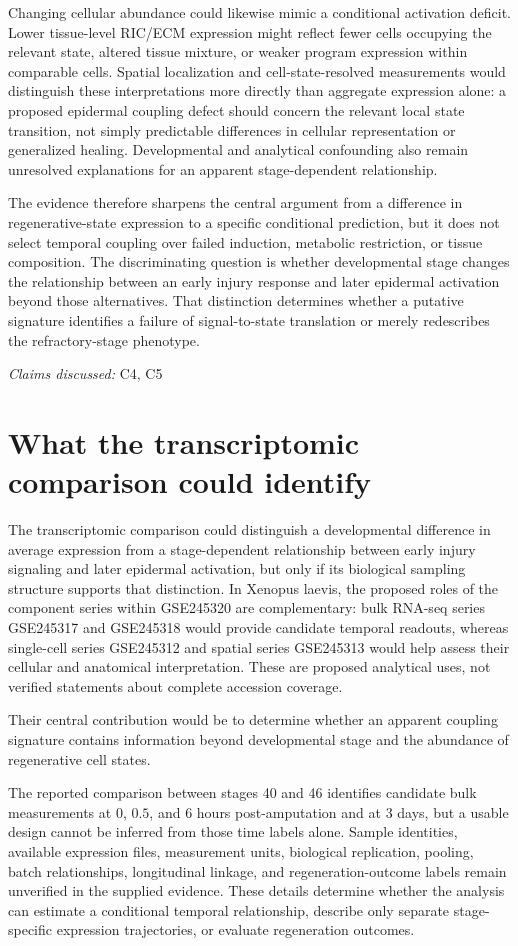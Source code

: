 \documentclass[11pt]{article}
\begin{document}
Changing cellular abundance could likewise mimic a conditional activation deficit. Lower tissue-level RIC/ECM expression might reflect fewer cells occupying the relevant state, altered tissue mixture, or weaker program expression within comparable cells. Spatial localization and cell-state-resolved measurements would distinguish these interpretations more directly than aggregate expression alone: a proposed epidermal coupling defect should concern the relevant local state transition, not simply predictable differences in cellular representation or generalized healing. Developmental and analytical confounding also remain unresolved explanations for an apparent stage-dependent relationship.

The evidence therefore sharpens the central argument from a difference in regenerative-state expression to a specific conditional prediction, but it does not select temporal coupling over failed induction, metabolic restriction, or tissue composition. The discriminating question is whether developmental stage changes the relationship between an early injury response and later epidermal activation beyond those alternatives. That distinction determines whether a putative signature identifies a failure of signal-to-state translation or merely redescribes the refractory-stage phenotype.

\textit{Claims discussed: }C4, C5
\section{What the transcriptomic comparison could identify}
The transcriptomic comparison could distinguish a developmental difference in average expression from a stage-dependent relationship between early injury signaling and later epidermal activation, but only if its biological sampling structure supports that distinction. In Xenopus laevis, the proposed roles of the component series within GSE245320 are complementary: bulk RNA-seq series GSE245317 and GSE245318 would provide candidate temporal readouts, whereas single-cell series GSE245312 and spatial series GSE245313 would help assess their cellular and anatomical interpretation. These are proposed analytical uses, not verified statements about complete accession coverage.

Their central contribution would be to determine whether an apparent coupling signature contains information beyond developmental stage and the abundance of regenerative cell states.

The reported comparison between stages 40 and 46 identifies candidate bulk measurements at $0$, $0.5$, and $6$ hours post-amputation and at $3$ days, but a usable design cannot be inferred from those time labels alone. Sample identities, available expression files, measurement units, biological replication, pooling, batch relationships, longitudinal linkage, and regeneration-outcome labels remain unverified in the supplied evidence. These details determine whether the analysis can estimate a conditional temporal relationship, describe only separate stage-specific expression trajectories, or evaluate regeneration outcomes.
\end{document}
